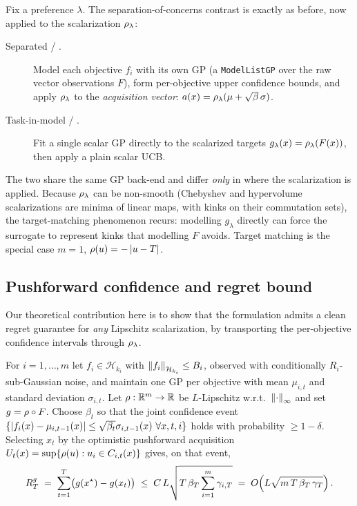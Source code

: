 Fix a preference $\lambda$. The separation-of-concerns contrast is exactly as
before, now applied to the scalarization $\rho_\lambda$:
\begin{description}
  \item[Separated / \RIGHT.] Model each objective $f_i$ with its own GP (a
        \texttt{ModelListGP} over the raw vector observations $F$), form
        per-objective upper confidence bounds, and apply $\rho_\lambda$ to the
        \emph{acquisition vector}: $a(x)=\rho_\lambda(\mu+\sqrt{\beta}\,\sigma)$.
  \item[Task-in-model / \WRONG.] Fit a single scalar GP directly to the
        scalarized targets $g_\lambda(x)=\rho_\lambda(F(x))$, then apply a plain
        scalar UCB.
\end{description}
The two share the same GP back-end and differ \emph{only} in where the
scalarization is applied. Because $\rho_\lambda$ can be non-smooth (Chebyshev and
hypervolume scalarizations are minima of linear maps, with kinks on their
commutation sets), the target-matching phenomenon recurs: modelling
$g_\lambda$ directly can force the surrogate to represent kinks that modelling
$F$ avoids. Target matching is the special case $m=1$, $\rho(u)=-\left\lvert u-T\right\rvert$.

\subsection{Pushforward confidence and regret bound}
\label{sec:contrib-mo-pushforward}

Our theoretical contribution here is to show that the \RIGHT{} formulation admits
a clean regret guarantee for \emph{any} Lipschitz scalarization, by transporting
the per-objective confidence intervals through $\rho_\lambda$.

\begin{theorem}
\label{thm:mo-pushforward}
For $i=1,\dots,m$ let $f_i\in\mathcal H_{k_i}$ with
$\left\lVert f_i\right\rVert_{\mathcal H_{k_i}}\le B_i$, observed with conditionally
$R_i$-sub-Gaussian noise, and maintain one GP per objective with mean $\mu_{i,t}$
and standard deviation $\sigma_{i,t}$. Let $\rho:\mathbb{R}^m\to\mathbb{R}$ be $L$-Lipschitz
w.r.t.\ $\left\lVert \cdot\right\rVert_\infty$ and set $g=\rho\circ F$. Choose $\beta_t$ so that
the joint confidence event
$\{\abs{f_i(x)-\mu_{i,t-1}(x)}\le\sqrt{\beta_t}\sigma_{i,t-1}(x)\ \forall x,t,i\}$
holds with probability $\ge1-\delta$. Selecting $x_t$ by the optimistic
pushforward acquisition
$U_t(x)=\sup\{\rho(u):u_i\in C_{i,t}(x)\}$ gives, on that event,
\begin{equation}
  R_T^{g} \;=\; \sum_{t=1}^T\bigl(g(x^\star)-g(x_t)\bigr)
  \;\le\; C\,L\sqrt{T\,\beta_T\sum_{i=1}^m\gamma_{i,T}}
  \;=\; O\!\left(L\sqrt{m\,T\,\beta_T\,\gamma_T}\right).
  \label{eq:mo-pushforward}
\end{equation}
\end{theorem}

